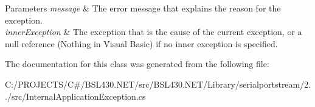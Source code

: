 \begin{DoxyParams}{Parameters}
{\em message} & The error message that explains the reason for the exception.\\
\hline
{\em inner\+Exception} & The exception that is the cause of the current exception, or a null reference (Nothing in Visual Basic) if no inner exception is specified.\\
\hline
\end{DoxyParams}


The documentation for this class was generated from the following file\+:\begin{DoxyCompactItemize}
\item 
C\+:/\+P\+R\+O\+J\+E\+C\+T\+S/\+C\#/\+B\+S\+L430.\+N\+E\+T/src/\+B\+S\+L430.\+N\+E\+T/\+Library/serialportstream/2../src/Internal\+Application\+Exception.\+cs\end{DoxyCompactItemize}
